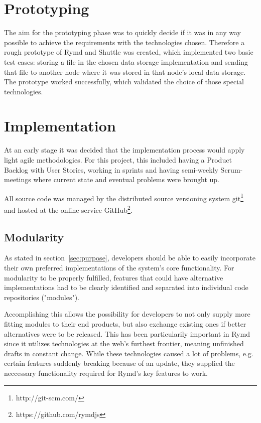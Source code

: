 \section{Prototyping}

The aim for the prototyping phase was to quickly decide if it was in any way possible to achieve the requirements with the technologies chosen. Therefore a rough prototype of Rymd and Shuttle was created, which implemented two basic test cases: storing a file in the chosen data storage implementation and sending that file to another node where it was stored in that node's local data storage. The prototype worked successfully, which validated the choice of those special technologies.

\section{Implementation}

At an early stage it was decided that the implementation process would apply light agile methodologies. For this project, this included having a Product Backlog with User Stories, working in sprints and having semi-weekly Scrum-meetings where current state and eventual problems were brought up.

All source code was managed by the distributed source versioning system git\footnote{http://git-scm.com/} and hosted at the online service GitHub\footnote{https://github.com/rymdjs}.

\subsection{Modularity}
\label{sec:modularity}

As stated in section~\ref{sec:purpose}, developers should be able to easily incorporate their own preferred implementations of the system's core functionality. For modularity to be properly fulfilled, features that could have alternative implementations had to be clearly identified and separated into individual code repositories ("modules").

Accomplishing this allows the possibility for developers to not only supply more fitting modules to their end products, but also exchange existing ones if better alternatives were to be released. This has been particularily important in Rymd since it utilizes technologies at the web's furthest frontier, meaning unfinished drafts in constant change. While these technologies caused a lot of problems, e.g. certain features suddenly breaking because of an update, they supplied the neccessary functionality required for Rymd's key features to work.
